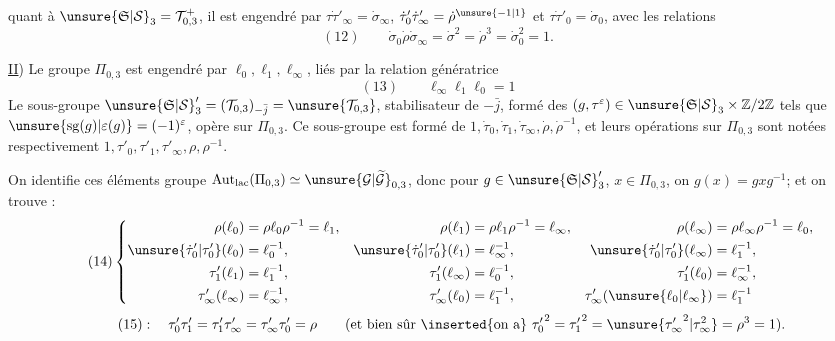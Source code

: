 quant à $\unsure{\mathfrak S|\mathcal S}_3=\mathcal T_{0,3}^{+}$, il est engendré par
$\tau\dot\tau'_\infty=\dot\sigma_\infty$, $\dot\tau'_0\dot\tau'_\infty=\dot\rho^{\unsure{-1|1}}$ et $\tau\dot\tau'_0=\dot\sigma_0$, avec les relations
\[
(12)\qquad
\dot\sigma_0\dot\rho\dot\sigma_\infty=\dot\sigma^2=\dot\rho^3=\dot\sigma_0^2=1.
\]

\uline{II}) Le groupe $\Pi_{0,3}$ est engendré par $\ell_0,\ell_1,\ell_\infty$, liés par la relation génératrice
\[
(13)\qquad \ell_\infty \ell_1\ell_0=1
\]
Le  sous-groupe 
$\unsure{\mathfrak S|\mathcal S}'_3=(\mathcal T_{0,3})_{-\bar j}=\unsure{\mathcal T_{0,3}}$,
stabilisateur de $-\bar j$, formé des $(g,\tau^\varepsilon)\in\unsure{\mathfrak S|\mathcal S}_3\times\mathbb Z/2\mathbb Z$ tels que $\unsure{\mathrm{sg}(g)|\varepsilon(g)}=(-1)^\varepsilon$, opère sur $\Pi_{0,3}$.
Ce sous-groupe est formé de $1,\dot\tau_0,\dot\tau_1,\dot\tau_\infty,\dot\rho,\dot\rho^{-1}$, et leurs opérations sur $\Pi_{0,3}$ sont notées respectivement $1,\tau'_0,\tau'_1,\tau'_\infty,\rho,\rho^{-1}$.



On identifie  ces éléments   groupe
$\mathrm{Aut}_{\mathrm{lac}}(\Pi_{0,3})\simeq\unsure{\mathcal G|\widetilde{\mathcal G}}_{0,3}$,
donc  pour $g\in\unsure{\mathfrak S|\mathcal S}'_3$, $x\in\Pi_{0,3}$, on 
$g(x)=gxg^{-1}$; et on trouve :
\[
\tag{14}
\left\{\begin{aligned}
\rho(\ell_0)&=\rho\ell_0\rho^{-1}=\ell_1,&
\rho(\ell_1)&=\rho\ell_1\rho^{-1}=\ell_\infty,&
\rho(\ell_\infty)&=\rho\ell_\infty\rho^{-1}=\ell_0,\\
\unsure{\dot\tau'_0|\tau'_0}(\ell_0)&=\ell_0^{-1},&
\unsure{\dot\tau'_0|\tau'_0}(\ell_1)&=\ell_\infty^{-1},&
\unsure{\dot\tau'_0|\tau'_0}(\ell_\infty)&=\ell_1^{-1},\\
\tau'_1(\ell_1)&=\ell_1^{-1},&
\tau'_1(\ell_\infty)&=\ell_0^{-1},&
\tau'_1(\ell_0)&=\ell_\infty^{-1},\\
\tau'_\infty(\ell_\infty)&=\ell_\infty^{-1},&
\tau'_\infty(\ell_0)&=\ell_1^{-1},&
\tau'_\infty(\unsure{\ell_0|\ell_\infty})&=\ell_1^{-1}
\end{aligned}\right.
\]
\[
\tag{15}
:\quad\tau'_0\tau'_1=\tau'_1\tau'_\infty=\tau'_\infty\tau'_0=\rho
\qquad\text{(et bien sûr \inserted{on a} }{\tau'_0}^{2}={\tau'_1}^{2}=\unsure{{\tau'_\infty}^{2}|\tau_\infty^{2}}=\rho^3=1\text{).}
\]

